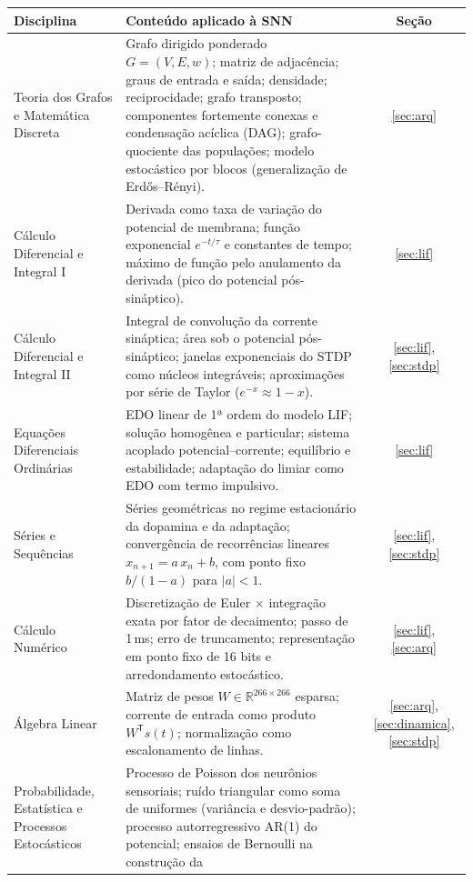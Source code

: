 \documentclass[11pt,a4paper]{article}
\renewcommand{\arraystretch}{1.25}
\begin{document}
\begin{center}
\small
\renewcommand{\arraystretch}{1.3}
\begin{longtable}{@{}>{\raggedright\arraybackslash}p{3.7cm}>{\raggedright\arraybackslash}p{10.4cm}c@{}}
\toprule
\textbf{Disciplina} & \textbf{Conteúdo aplicado à SNN} & \textbf{Seção} \\
\midrule
\endhead
Teoria dos Grafos e Matemática Discreta & Grafo dirigido ponderado $G=(V,E,w)$; matriz de adjacência; graus de entrada e saída;
  densidade; reciprocidade; grafo transposto; componentes fortemente conexas e condensação acíclica (DAG); grafo-quociente das
  populações; modelo estocástico por blocos (generalização de Erdős–Rényi). & \ref{sec:arq} \\
Cálculo Diferencial e Integral I & Derivada como taxa de variação do potencial de membrana; função exponencial $e^{-t/\tau}$ e
  constantes de tempo; máximo de função pelo anulamento da derivada (pico do potencial pós-sináptico). & \ref{sec:lif} \\
Cálculo Diferencial e Integral II & Integral de convolução da corrente sináptica; área sob o potencial pós-sináptico; janelas
  exponenciais do STDP como núcleos integráveis; aproximações por série de Taylor ($e^{-x}\approx 1-x$). & \ref{sec:lif}, \ref{sec:stdp} \\
Equações Diferenciais Ordinárias & EDO linear de 1ª ordem do modelo LIF; solução homogênea e particular; sistema acoplado
  potencial–corrente; equilíbrio e estabilidade; adaptação do limiar como EDO com termo impulsivo. & \ref{sec:lif} \\
Séries e Sequências & Séries geométricas no regime estacionário da dopamina e da adaptação; convergência de recorrências
  lineares $x_{n+1}=a\,x_n+b$, com ponto fixo $b/(1-a)$ para $|a|<1$. & \ref{sec:lif}, \ref{sec:stdp} \\
Cálculo Numérico & Discretização de Euler $\times$ integração exata por fator de decaimento; passo de 1\,ms; erro de
  truncamento; representação em ponto fixo de 16 bits e arredondamento estocástico. & \ref{sec:lif}, \ref{sec:arq} \\
Álgebra Linear & Matriz de pesos $W\in\mathbb{R}^{266\times266}$ esparsa; corrente de entrada como produto $W^{\mathsf T}s(t)$;
  normalização como escalonamento de linhas. & \ref{sec:arq}, \ref{sec:dinamica}, \ref{sec:stdp} \\
Probabilidade, Estatística e Processos Estocásticos & Processo de Poisson dos neurônios sensoriais; ruído triangular como soma
  de uniformes (variância e desvio-padrão); processo autorregressivo AR(1) do potencial; ensaios de Bernoulli na construção da

\end{longtable}
\end{center}
\end{document}
